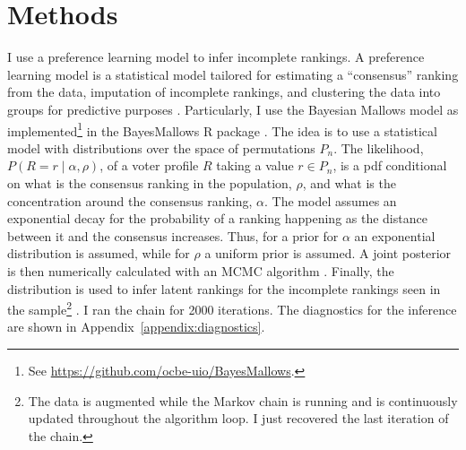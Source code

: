\documentclass[hidelinks,11pt]{article}
\begin{document}
\begin{table}[]\centering
{}
\caption{Frequency of pairwise comparisons in the dataset.}

\label{Tab:Tcpairwise}
\end{table}


\section{Methods}

I use a preference learning model to infer incomplete rankings. A preference learning model is a statistical model tailored for estimating a ``consensus'' ranking from the data, imputation of incomplete rankings, and clustering the data into groups for predictive purposes \parencite{liu2019model}. Particularly, I use the Bayesian Mallows model as implemented\footnote{See \url{https://github.com/ocbe-uio/BayesMallows}.} in the BayesMallows R package \parencite{sorensen2019bayesmallows, lu2011learning}. The idea is to use a statistical model with distributions over the space of permutations \(P_{n}\). The likelihood, \(P(R = r \mid \alpha, \rho)\), of a voter profile \(R\) taking a value \(r \in P_{n}\), is a pdf conditional on what is the consensus ranking in the population, \(\rho\), and what is the concentration around the consensus ranking, \(\alpha\). The model assumes an exponential decay for the probability of a ranking happening as the distance between it and the consensus increases. Thus, for a prior for \(\alpha\) an exponential distribution is assumed, while for \(\rho\) a uniform prior is assumed. A joint posterior is then numerically calculated with an MCMC algorithm \parencite{sorensen2019bayesmallows}. Finally, the distribution is used to infer latent rankings for the incomplete rankings seen in the sample\footnote{The data is augmented while the Markov chain is running and is continuously updated throughout the algorithm loop. I just recovered the last iteration of the chain.} \parencite{sorensen2019bayesmallows}. I ran the chain for 2000 iterations. The diagnostics for the inference are shown in Appendix~\ref{appendix:diagnostics}.
\end{document}
